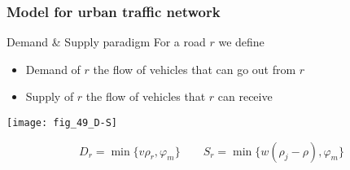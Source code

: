 \begin{frame}
    \frametitle{Model for urban traffic network}
    \begin{block}{Demand \& Supply paradigm}
    For a road $r$ we define
    \begin{itemize}
    \item Demand of $r$ the flow of vehicles that can go out from $r$
    \item Supply of $r$ the flow of vehicles that $r$ can receive
    \end{itemize}
    \end{block}
    \begin{center}
    \texttt{[image: fig\_49\_D-S]}
    \end{center}
    \[
    D_r = \min \{ v\rho_r, \varphi_m\}
    \qquad
    S_r = \min\{ w(\rho_j-\rho) , \varphi_m \}
    \]
\end{frame}
